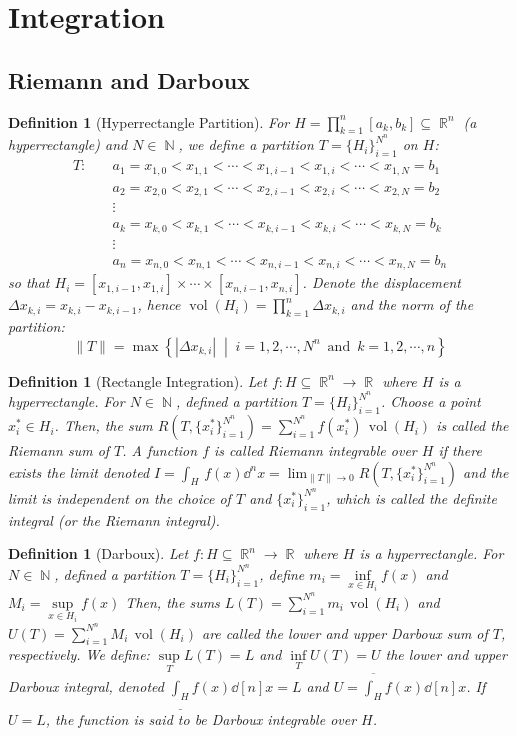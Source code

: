 \documentclass[12pt]{article}
\newcommand{\set}[2]{\left\{{#1}\;\middle|\;{#2}\right\}}
\DeclareMathOperator{\R}{\mathbb{R}}
\DeclareMathOperator{\N}{\mathbb{N}}
\DeclareMathOperator{\vol}{vol}
\newtheorem{definition}[theorem]{Definition}
\begin{document}
\pagebreak

\section{Integration}

\subsection{Riemann and Darboux}

\begin{definition}[Hyperrectangle Partition]
  For $H=\prod_{k=1}^n[a_k,b_k]\subseteq\R^n$ (a hyperrectangle) and $N\in\N$, we define a partition $T=\{H_i\}_{i=1}^{N^n}$ on $H$: 
  \begin{align*}
    T:\quad & a_1=x_{1,0}<x_{1,1}<\cdots<x_{1,i-1}<x_{1,i}<\cdots<x_{1,N}=b_1\\
    & a_2=x_{2,0}<x_{2,1}<\cdots<x_{2,i-1}<x_{2,i}<\cdots<x_{2,N}=b_2\\
    &\vdots\\
    & a_k=x_{k,0}<x_{k,1}<\cdots<x_{k,i-1}<x_{k,i}<\cdots<x_{k,N}=b_k\\
    & \vdots \\
    & a_n=x_{n,0}<x_{n,1}<\cdots<x_{n,i-1}<x_{n,i}<\cdots<x_{n,N}=b_n
  \end{align*}
  so that $H_i=[x_{1,i-1},x_{1,i}]\times\cdots\times[x_{n,i-1},x_{n,i}]$. Denote the displacement $\Delta x_{k,i}=x_{k,i}-x_{k,i-1}$, hence $\vol(H_i)=\prod_{k=1}^n\Delta x_{k,i}$ and the norm of the partition: $$\|T\|=\max\set{|\Delta x_{k,i}|}{i=1,2,\cdots,N^n\,\text{ and }\,k=1,2,\cdots,n}$$
\end{definition}

\begin{definition}[Rectangle Integration]
  Let $f:H\subseteq\R^n\to\R$ where $H$ is a hyperrectangle. For $N\in\N$, defined a partition $T=\{H_i\}_{i=1}^{N^n}$. Choose a point $x_i^*\in H_i$. Then, the sum $\displaystyle R(T,\{x_i^*\}_{i=1}^{N^n})=\sum_{i=1}^{N^n} f(x_i^*)\,\vol(H_i)$ is called the Riemann sum of $T$. A function $f$ is called Riemann integrable over $H$ if there exists the limit denoted $\displaystyle I=\int_H\,f(x)\dd^n{x}=\lim_{\|T\|\to 0}R(T,\{x_i^*\}_{i=1}^{N^n})$ and the limit is independent on the choice of $T$ and $\{x_i^*\}_{i=1}^{N^n}$, which is called the definite integral (or the Riemann integral).
\end{definition}

\begin{definition}[Darboux]
  Let $f:H\subseteq\R^n\to\R$ where $H$ is a hyperrectangle. For $N\in\N$, defined a partition $T=\{H_i\}_{i=1}^{N^n}$, define $m_i=\inf\limits_{x\in H_i}f(x)$ and $M_i=\sup\limits_{x\in H_i}f(x)$
  Then, the sums $L(T)=\sum_{i=1}^{N^n} m_i\,\vol(H_i)$ and $U(T)=\sum_{i=1}^{N^n} M_i\,\vol(H_i)$ are called the lower and upper Darboux sum of $T$, respectively. We define: $\sup\limits_T L(T)=L$ and $\inf\limits_T U(T)=U$ the lower and upper Darboux integral, denoted
  $\displaystyle\underline{\int_H}f(x)\dd[n]{x}=L$ and $\displaystyle U=\overline{\int_H}f(x)\dd[n]{x}$. If $U=L$, the function is said to be Darboux integrable over $H$.
\end{definition}
\end{document}

